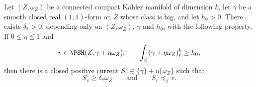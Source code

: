 \begin{lemma}\label{nk:lem:domination}
Let $(Z,\omega_Z)$ be a connected compact K\"ahler manifold of
dimension $k$, let
$\gamma$ be a smooth closed real $(1,1)$-form on $Z$ whose class is
big, and let $h_0>0$. There exists $\delta_*>0$, depending only on
$(Z,\omega_Z)$, $\gamma$ and $h_0$, with the following property. If
$0\le\eta\le1$ and
\begin{equation}\label{nk:eq:dom-hyp}
  v\in\PSH(Z,\gamma+\eta\omega_Z),\qquad
  \int_Z(\gamma+\eta\omega_Z)_v^k\ge h_0,
\end{equation}
then there is a closed positive current
$S_v\in\{\gamma\}+\eta\{\omega_Z\}$ such that
\begin{equation}\label{nk:eq:dom-concl}
  S_v\ge\delta_*\omega_Z
  \qquad\text{and}\qquad S_v\preceq_{\mathcal I} v.
\end{equation}
\end{lemma}

